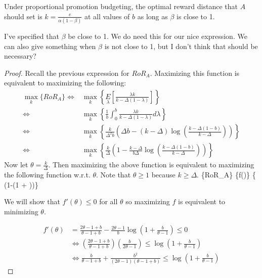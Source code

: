 \begin{theorem}
Under proportional promotion budgeting, the optimal reward distance that $A$ should set is $k = \frac{e}{\alpha(1-\beta)}$ at all values of $b$ as long as $\beta$ is close to 1.
\end{theorem}
{\nolan I've specified that $\beta$ be close to 1. We do need this for our nice expression. We can also give something when $\beta$ is not close to 1, but I don't think that should be necessary?}
\begin{proof}
Recall the previous expression for $RoR_A$. Maximizing this function is equivalent to maximizing the following:
\begin{align*}
\underset{k}\max\{RoR_A\} \Leftrightarrow & \underset{k}\max\left\{\underset{\lambda}E\left[\frac{\lambda k}{k-\Delta(1-\lambda)}\right]\right\}\\
                          \Leftrightarrow & \underset{k}\max\left\{ \frac{1}{b}\int_{0}^{b} \frac{\lambda k}{k-\Delta(1-\lambda)}d\lambda \right\}\\
                          \Leftrightarrow & \underset{k}\max\left\{ \frac{k}{\Delta^2 b}\left(\Delta b - (k-\Delta)\log\left(\frac{k-\Delta(1-b)}{k-\Delta}\right)\right) \right\}\\
                          \Leftrightarrow & \underset{k} \max\left\{\frac{k}{\Delta}\left(1-\frac{k-\Delta}{b\Delta}\log\left(\frac{k-\Delta(1-b)}{k-\Delta}\right)\right)\right\}
\end{align*}
Now let $\theta = \frac{k}{\Delta}$. Then maximizing the above function is equivalent to maximizing the following function w.r.t. $\theta$. Note that $\theta \geq 1$ because $k \geq \Delta$.
\beq
{}\max\{RoR_A\} \Leftrightarrow \underset{\theta}\max\{f(\theta)\} \Leftrightarrow \underset{\theta}\max\left\{ \theta \left(1-\log\left(1 + \right)\right)\right\} 
\eeq

We will show that $f'(\theta) \leq 0$ for all $\theta$ so maximizing $f$ is equivalent to minimizing $\theta$.

\begin{align*}
f'(\theta) &= \frac{2\theta-1+b}{\theta-1+b} - \frac{2\theta-1}{b} \log \left(1+\frac{b}{\theta-1} \right) \leq 0 \\
&\iff \left(\frac{2\theta-1+b}{\theta-1+b}\right)\left(\frac{b}{2\theta-1} \right) \leq \log \left(1+\frac{b}{\theta-1} \right) \\
&\iff \frac{b}{\theta-1+b}+\frac{b^2}{(2\theta-1)(\theta-1+b)} \leq \log \left(1+\frac{b}{\theta-1} \right)
\end{align*}


\end{proof}
